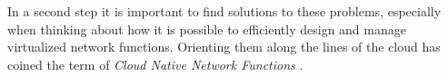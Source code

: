 In a second step it is important to find solutions to these problems, especially when thinking about how it is possible to efficiently design and manage virtualized network functions. Orienting them along the lines of the cloud has coined the term of \textit{Cloud Native Network Functions} \cite{CNF} \cite{cn5gvnf} \cite{evolutionnfv}. 
